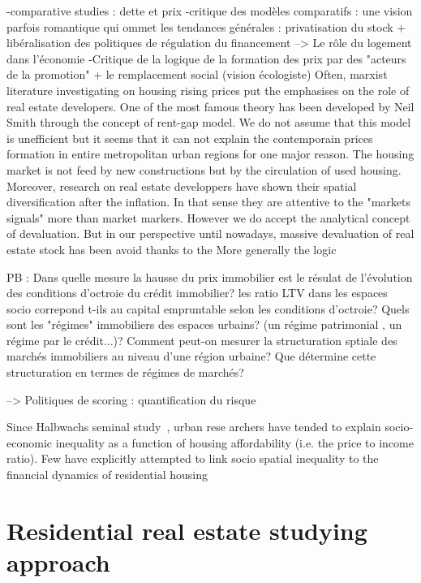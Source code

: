 -comparative studies : dette et prix
-critique des modèles comparatifs : une vision parfois romantique qui ommet les tendances générales : privatisation du stock + libéralisation des politiques de régulation du financement
--> Le rôle du logement dans l'économie
-Critique de la logique de la formation des prix par des "acteurs de la promotion" + le remplacement social (vision écologiste)
Often, marxist literature investigating on housing rising prices put the emphasises on the role of real estate developers. One of the most famous theory has been developed by Neil Smith through the concept of rent-gap model. We do not assume that this model is unefficient but it seems that it can not explain the contemporain prices formation in entire metropolitan urban regions for one major reason. The housing market is not feed by new constructions but by the circulation of used housing. Moreover, research on real estate developpers have shown their spatial diversification after the inflation. In that sense they are attentive to the "markets signals" more than market markers. However we do accept the analytical concept of devaluation. But in our perspective until nowadays, massive devaluation of real estate stock has been avoid thanks to the  More generally the logic 

PB : Dans quelle mesure la hausse du prix immobilier est le résulat de l'évolution des conditions d'octroie du crédit immobilier? 
les ratio LTV dans les espaces socio correpond t-ils au capital empruntable selon les conditions d'octroie? Quels sont les "régimes" immobiliers des espaces urbains? (un régime patrimonial , un régime par le crédit...)?
Comment peut-on mesurer la structuration sptiale des marchés immobiliers au niveau d'une région urbaine? Que détermine cette structuration en termes de régimes de marchés?

--> Politiques de scoring : quantification du risque

Since Halbwachs seminal study~\cite{halbwachs1913classe}, urban rese
archers have tended to explain socio-economic inequality as  a  function  of  housing  affordability  (i.e.  the  price to
income  ratio).  Few  have  explicitly  attempted  to  link socio spatial  inequality  to  the  financial  dynamics  of  residential  housing

\section{Residential real estate studying approach}
